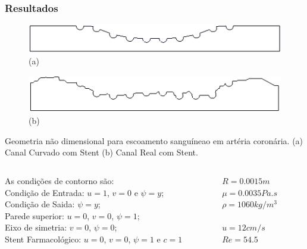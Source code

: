 \begin{frame}
 \frametitle{\Large Resultados}
\begin{figure}
  \vspace{-1cm}
     \centering
     \begin{minipage}{.45\linewidth}
      \centering
      \includegraphics[scale=0.15]{images/CurvedStrut.png}\\
      \scriptsize (a)
     \end{minipage}%
     \begin{minipage}{.45\linewidth}
      \centering
      \includegraphics[scale=0.15]{images/RealStrut.png}\\
      \scriptsize (b)
     \end{minipage}
\end{figure}
\vspace{-0.3cm}
\begin{center}
\scriptsize 
     Geometria não dimensional para escoamento sanguíneao em artéria coronária.
     (a) Canal Curvado com Stent
     (b) Canal Real com Stent.
\end{center}
\vspace{0.05cm}
\small
\begin{center}
\begin{columns}[c]
\begin{column}{0.8\textwidth} 
As condições de contorno são:\\[0.2cm]
Condição de Entrada: $u=1$, $v=0$ e $\psi=y$;\\[0.1cm]
Condição de Saida: $\psi=y$;\\[0.1cm]
Parede superior: $u=0$, $v=0$, $\psi=1$;\\[0.1cm]
Eixo de simetria: $v=0$, $\psi=0$; \\[0.1cm]
Stent Farmacológico: $u=0$, $v=0$, $\psi=1$ e $c=1$
\end{column}
\hspace{-1cm}
\begin{column}{0.3\textwidth}
$R=0.0015m$\\[0.1cm]
$\mu=0.0035Pa.s$\\[0.1cm]
$\rho=1060kg/m^3$\\[0.1cm]\\
$u=12cm/s$\\[0.1cm]
$Re=54.5$
\end{column}
\end{columns}
\end{center}
\end{frame}

